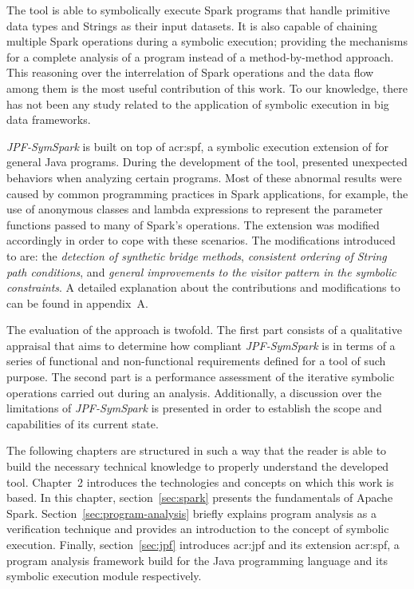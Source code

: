 The tool is able to symbolically execute Spark programs that handle primitive data types and Strings as their input datasets. It is also capable of chaining multiple Spark operations during a symbolic execution; providing the mechanisms for a complete analysis of a program instead of a method-by-method approach. This reasoning over the interrelation of Spark operations and the data flow among them is the most useful contribution of this work. To our knowledge, there has not been any study related to the application of symbolic execution in big data frameworks.

\textit{JPF-SymSpark} is built on top of \acrfull{acr:spf}, a symbolic execution extension of \jpf{} for general Java programs. During the development of the tool, \spf{} presented unexpected behaviors when analyzing certain programs. Most of these abnormal results were caused by common programming practices in Spark applications, for example, the use of anonymous classes and lambda expressions to represent the parameter functions passed to many of Spark's operations. The \spf{} extension was modified accordingly in order to cope with these scenarios. The modifications introduced to \spf{} are: the \textit{detection of synthetic bridge methods}, \textit{consistent ordering of String path conditions}, and \textit{general improvements to the visitor pattern in the symbolic constraints}. A detailed explanation about the contributions and modifications to \spf{} can be found in appendix~A.

The evaluation of the approach is twofold. The first part consists of a qualitative appraisal that aims to determine how compliant \textit{JPF-SymSpark} is in terms of a series of functional and non-functional requirements defined for a tool of such purpose. The second part is a performance assessment of the iterative symbolic operations carried out during an analysis. Additionally, a discussion over the limitations of \textit{JPF-SymSpark} is presented in order to establish the scope and capabilities of its current state.


The following chapters are structured in such a way that the reader is able to build the necessary technical knowledge to properly understand the developed tool. Chapter~2 introduces the technologies and concepts on which this work is based. In this chapter, section~\ref{sec:spark} presents the fundamentals of Apache Spark. Section~\ref{sec:program-analysis} briefly explains program analysis as a verification technique and provides an introduction to the concept of symbolic execution. Finally, section~\ref{sec:jpf} introduces \acrlong{acr:jpf} and its extension \acrlong{acr:spf}, a program analysis framework build for the Java programming language and its symbolic execution module respectively.

